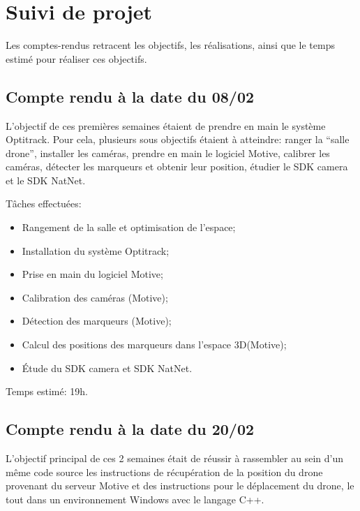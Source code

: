 \chapter{Suivi de projet}
	Les comptes-rendus retracent les objectifs, les réalisations, ainsi que le temps estimé pour réaliser ces objectifs.

	\section{Compte rendu à la date du 08/02}
		L'objectif de ces premières semaines étaient de prendre en main le système Optitrack. Pour cela, plusieurs sous objectifs étaient à atteindre: ranger la ``salle drone'', installer les caméras, prendre en main le logiciel Motive, calibrer les caméras, détecter les marqueurs et obtenir leur position, étudier le SDK camera et le SDK NatNet.

		Tâches effectuées:
		\begin{itemize}
			\item Rangement de la salle et optimisation de l'espace;
			\item Installation du système Optitrack;
			\item Prise en main du logiciel Motive;
			\item Calibration des caméras (Motive);
			\item Détection des marqueurs (Motive);
			\item Calcul des positions des marqueurs dans l'espace 3D\@ (Motive);
			\item Étude du SDK camera et SDK NatNet. \\
		\end{itemize}

		Temps estimé: 19h.


	\section{Compte rendu à la date du 20/02}
		L'objectif principal de ces 2 semaines était de réussir à rassembler au sein d'un même code source les instructions de récupération de la position du drone provenant du serveur Motive et des instructions pour le déplacement du drone, le tout dans un environnement Windows avec le langage C++.

